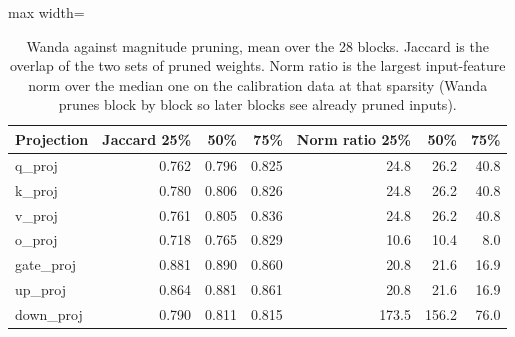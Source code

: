 \begin{table}[!htb]
\centering
\scriptsize
\setlength{\tabcolsep}{3.5pt}
\caption{Wanda against magnitude pruning, mean over the 28 blocks. Jaccard is the overlap of the two sets of pruned weights. Norm ratio is the largest input-feature norm over the median one on the calibration data at that sparsity (Wanda prunes block by block so later blocks see already pruned inputs).}
\label{tab:t1masks}
\begin{adjustbox}{max width=\linewidth}
\begin{tabular}{lrrrrrr}
\toprule
Projection & Jaccard 25\% & 50\% & 75\% & Norm ratio 25\% & 50\% & 75\% \\
\midrule
q\_proj & 0.762 & 0.796 & 0.825 & 24.8 & 26.2 & 40.8 \\
k\_proj & 0.780 & 0.806 & 0.826 & 24.8 & 26.2 & 40.8 \\
v\_proj & 0.761 & 0.805 & 0.836 & 24.8 & 26.2 & 40.8 \\
o\_proj & 0.718 & 0.765 & 0.829 & 10.6 & 10.4 & 8.0 \\
gate\_proj & 0.881 & 0.890 & 0.860 & 20.8 & 21.6 & 16.9 \\
up\_proj & 0.864 & 0.881 & 0.861 & 20.8 & 21.6 & 16.9 \\
down\_proj & 0.790 & 0.811 & 0.815 & 173.5 & 156.2 & 76.0 \\
\bottomrule
\end{tabular}
\end{adjustbox}
\end{table}
